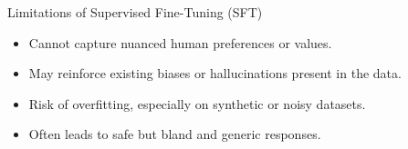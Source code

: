 \begin{frame}{Limitations of Supervised Fine-Tuning (SFT)}
  \begin{itemize}
    \item[\textcolor{red}{$\blacktriangleright$}] Cannot capture nuanced human preferences or values.
    \item[\textcolor{red}{$\blacktriangleright$}] May reinforce existing biases or hallucinations present in the data.
    \item[\textcolor{red}{$\blacktriangleright$}] Risk of overfitting, especially on synthetic or noisy datasets.
    \item[\textcolor{red}{$\blacktriangleright$}] Often leads to safe but bland and generic responses.
  \end{itemize}
\end{frame}
